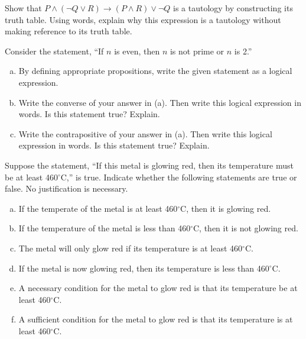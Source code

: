 \documentclass[11pt,letterpaper]{article}
\begin{document}

 Show that $P \wedge (\neg Q \vee R) \to (P \wedge R) \vee \neg Q$ is a tautology by constructing its truth table. Using words, explain why this expression is a tautology without making reference to its truth table.



\newpage



 Consider the statement, ``If $n$ is even, then $n$ is not prime or $n$ is 2.''
	\begin{enumerate}[(a)]
	\item By defining appropriate propositions, write the given statement as a logical expression.
	\item Write the converse of your answer in (a). Then write this logical expression in words. Is this statement true? Explain.
	\item Write the contrapositive of your answer in (a). Then write this logical expression in words. Is this statement true? Explain. 
	\end{enumerate}



\newpage



 Suppose the statement, ``If this metal is glowing red, then its temperature must be at least 460$^\circ$C,'' is true. Indicate whether the following statements are true or false. No justification is necessary.
	\begin{enumerate}[(a)]
	\item If the temperate of the metal is at least 460$^\circ$C, then it is glowing red.
	\item If the temperature of the metal is less than 460$^\circ$C, then it is not glowing red.
	\item The metal will only glow red if its temperature is at least 460$^\circ$C.
	\item If the metal is now glowing red, then its temperature is less than 460$^\circ$C.
	\item A necessary condition for the metal to glow red is that its temperature be at least 460$^\circ$C.
	\item A sufficient condition for the metal to glow red is that its temperature is at least 460$^\circ$C.
	\end{enumerate}
\end{document}
